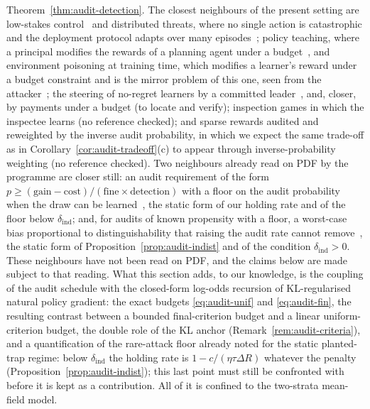 \begin{remark}
Theorem~\ref{thm:audit-detection}. The closest neighbours of the present setting are low-stakes control~\cite{christiano2021lowstakes} and distributed threats, where no single action is catastrophic and the deployment protocol adapts over many episodes~\cite{wen2024adaptive}; policy teaching, where a principal modifies the rewards of a planning agent under a budget~\cite{zhang2008policyteaching}, and environment poisoning at training time, which modifies a learner's reward under a budget constraint and is the mirror problem of this one, seen from the attacker~\cite{rakhsha2020poisoning}; the steering of no-regret learners by a committed leader~\cite{deng2019strategizing}, and, closer, by payments under a budget (to locate and verify); inspection games in which the inspectee learns (no reference checked); and sparse rewards audited and reweighted by the inverse audit probability, in which we expect the same trade-off as in Corollary~\ref{cor:audit-tradeoff}(c) to appear through inverse-probability weighting (no reference checked). Two neighbours already read on PDF by the programme are closer still: an audit requirement of the form $p\ge(\text{gain}-\text{cost})/(\text{fine}\times\text{detection})$ with a floor on the audit probability when the draw can be learned~\cite{gans2026randomized}, the static form of our holding rate and of the floor below $\delta_{\mathrm{ind}}$; and, for audits of known propensity with a floor, a worst-case bias proportional to distinguishability that raising the audit rate cannot remove~\cite{zhu2026blindfold}, the static form of Proposition~\ref{prop:audit-indist} and of the condition $\delta_{\mathrm{ind}}>0$. These neighbours have not been read on PDF, and the claims below are made subject to that reading. What this section adds, to our knowledge, is
the coupling of the audit schedule with the closed-form log-odds recursion of
KL-regularised natural policy gradient: the exact budgets
\eqref{eq:audit-unif} and \eqref{eq:audit-fin}, the resulting contrast between
a bounded final-criterion budget and a linear uniform-criterion budget, the
double role of the KL anchor (Remark~\ref{rem:audit-criteria}), and a quantification of the rare-attack floor already noted for the static planted-trap regime: below $\delta_{\mathrm{ind}}$ the holding rate is $1-c/(\eta\tau\Delta R)$ whatever the penalty (Proposition~\ref{prop:audit-indist}); this last point must still be confronted with~\cite{gans2026randomized,zhu2026blindfold} before it is kept as a contribution. All of it is
confined to the two-strata mean-field model.
\end{remark}

